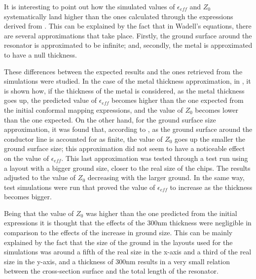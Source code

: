 \documentclass[12pt, a4paper]{article}
\begin{document}
It is interesting to point out how the simulated values of $\epsilon_{eff}$ and $Z_0$ systematically land higher than the ones calculated through the expressions derived from \cite{RaineeN2001}. This can be explained by the fact that in Wadell's equations\cite{Wadell1991}, there are several approximations that take place. Firstly, the ground surface around the resonator is approximated to be infinite; and, secondly, the metal is approximated to have a null thickness. 

These differences between the expected results and the ones retrieved from the simulations were studied. In the case of the metal thickness approximation, in \cite{RaineeN2001}, it is shown how, if the thickness of the metal is considered, as the metal thickness goes up, the predicted value of $\epsilon_{eff}$ becomes higher than the one expected from the initial conformal mapping expressions, and the value of $Z_0$ becomes lower than the one expected. On the other hand, for the ground surface size approximation, it was found that, according to \cite{Ghione1987}, as the ground surface around the conductor line is accounted for as finite, the value of $Z_0$ goes up the smaller the ground surface size; this approximation did not seem to have a noticeable effect on the value of $\epsilon_{eff}$. This last approximation was tested through a test run using a layout with a bigger ground size, closer to the real size of the chips. The results adjusted to the value of $Z_0$ decreasing with the larger ground. In the same way, test simulations were run that proved the value of $\epsilon_{eff}$ to increase as the thickness becomes bigger.

Being that the value of $Z_0$ was higher than the one predicted from the initial expressions it is thought that the effects of the 300nm thickness were negligible in comparison to the effects of the increase in ground size. This can be mainly explained by the fact that the size of the ground in the layouts used for the simulations was around a fifth of the real size in the x-axis and a third of the real size in the y-axis, and a thickness of 300nm results in a very small relation between the cross-section surface and the total length of the resonator.
\end{document}
